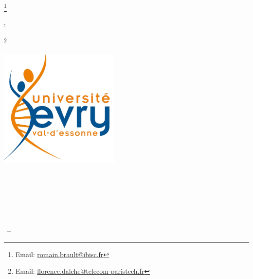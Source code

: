 
\begin{titlepage}

\renewcommand*{\thefootnote}{\fnsymbol{footnote}}
\begin{addmargin}[-1cm]{-3cm}
\begin{center}
\large

\hfill
\vfill

\begingroup
\color{Maroon}\spacedallcaps{\myTitle} \\ \bigskip %
\endgroup

\spacedlowsmallcaps{\myName}\footnote{Email: \href{mailto:romain.brault@ibisc.fr}{romain.brault@ibisc.fr}} %

\vfill

\noindent {}:
\par
\mySupervisorDegree \mySupervisor\footnote{Email: \href{mailto:florence.dalche@telecom-paristech.fr}{florence.dalche@telecom-paristech.fr}}

\vfill

\includegraphics[width=6cm]{gfx/University_of_Evry_Val_d_Essonne_logo} \\ \medskip %

\mySubtitle \\ \medskip %
\myDegree \\
\myDepartment \\
\myFaculty \\
\myUni \\ \bigskip

\myTime\ -- \myVersion %

\vfill

\end{center}
\end{addmargin}

\renewcommand*{\thefootnote}{\arabic{footnote}}
\setcounter{footnote}{0}
\end{titlepage}